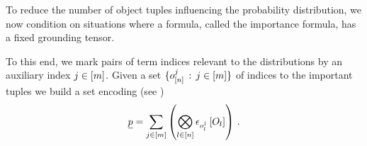 

%











To reduce the number of object tuples influencing the probability distribution, we now condition \HybridFOLNetworks{} on situations where a formula, called the importance formula, has a fixed grounding tensor.

To this end, we mark pairs of term indices relevant to the distributions by an auxiliary index $j\in[m]$.
Given a set $\{o_{[n]}^{j} \,:\, j\in[m] \}$ of indices to the important tuples we build a set encoding (see )
\begin{align*}
    \underline{p} = \sum_{j\in[m]} \left(
    \bigotimes_{l\in[n]} \epsilon_{o_{l}^{j}}\left[O_{l}\right]
    \right) \, .
\end{align*}

